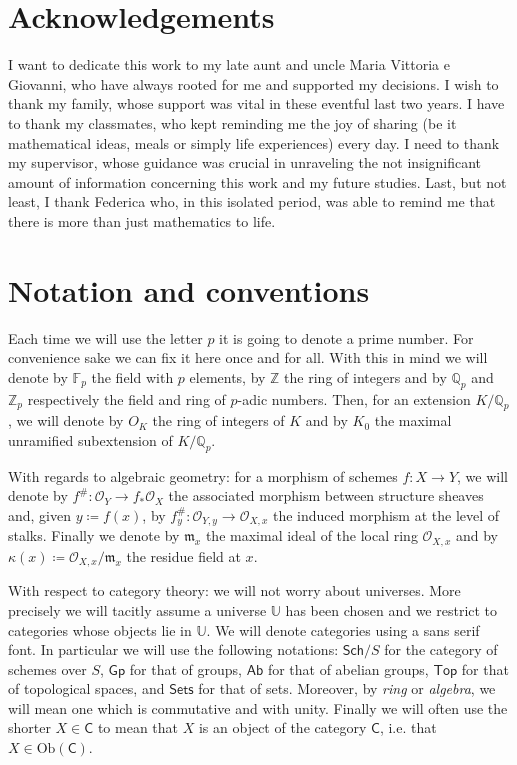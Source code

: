 \section*{Acknowledgements}
I want to dedicate this work to my late aunt and uncle Maria Vittoria e Giovanni,
who have always rooted for me and supported my decisions.
I wish to thank my family, whose support was vital in these eventful last two years.
I have to thank my classmates, who kept reminding me the joy of sharing
(be it mathematical ideas, meals or simply life experiences) every day.
I need to thank my supervisor, whose guidance was crucial in unraveling
the not insignificant amount of information concerning this work and my future studies.
Last, but not least, I thank Federica who, in this isolated period,
was able to remind me that there is more than just mathematics to life.
\newpage


\section*{Notation and conventions}
Each time we will use the letter $p$ it is going to denote a prime number.
For convenience sake we can fix it here once and for all.
With this in mind we will denote by $\mathbb{F}_{p}$ the field with $p$ elements,
by $\mathbb{Z}$ the ring of integers and by $\mathbb{Q}_p$ and $\mathbb{Z}_{p}$
respectively the field and ring of $p$-adic numbers.
Then, for an extension $K/\mathbb{Q}_p$, we will denote by $O_K$ the ring of
integers of $K$ and by $K_0$ the maximal unramified subextension of $K/\mathbb{Q}_p$.

With regards to algebraic geometry: for a morphism of schemes $f\colon X \to Y$,
we will denote by $f^{\#}\colon \mathcal{O}_{ Y } \to f_*\mathcal{O}_{ X }$ the
associated morphism between structure sheaves and, given $y \coloneqq f(x)$,
by $f_y^{\#}\colon \mathcal{O}_{ Y,y } \to \mathcal{O}_{ X,x }$ the induced morphism
at the level of stalks.
Finally we denote by $\mathfrak{m}_x$ the maximal ideal of the local ring
$\mathcal{O}_{ X,x }$ and by $\kappa(x) \coloneqq \mathcal{O}_{ X,x }/\mathfrak{m}_x$
the residue field at $x$.

With respect to category theory:
we will not worry about universes. More precisely we will
tacitly assume a universe $\mathbb{U}$ has been chosen
and we restrict to categories whose objects lie in $\mathbb{U}$.
We will denote categories using a sans serif font.
In particular we will use the following notations:
$\mathsf{Sch}/S$ for the category of schemes over $S$,
$\mathsf{Gp}$ for that of groups,
$\mathsf{Ab}$ for that of abelian groups,
$\mathsf{Top}$ for that of topological spaces,
and $\mathsf{Sets}$ for that of sets.
Moreover, by {\em ring} or {\em algebra}, we will mean one which is commutative and with unity.
Finally we will often use the shorter $X \in \mathsf{C}$ to mean that $X$ is an object
of the category $\mathsf{C}$, i.e. that $X \in \mathrm{Ob} \left(\mathsf{C}\right)$.
